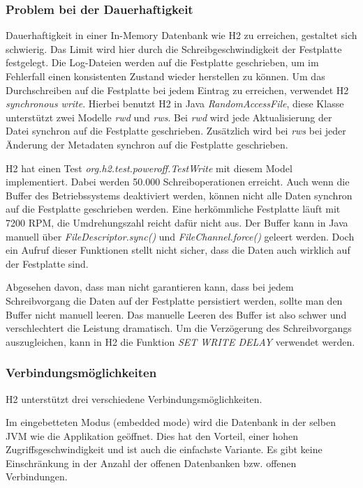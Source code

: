 \documentclass[draft,final]{vutinfth} %
\begin{document}
\subsubsection*{Problem bei der Dauerhaftigkeit}
Dauerhaftigkeit in einer In-Memory Datenbank wie H2 zu erreichen, gestaltet sich schwierig. Das Limit wird hier durch die Schreibgeschwindigkeit der Festplatte festgelegt. Die Log-Dateien werden auf die Festplatte geschrieben, um im Fehlerfall einen konsistenten Zustand wieder herstellen zu können. Um das Durchschreiben auf die Festplatte bei jedem Eintrag zu erreichen, verwendet H2 \textit{synchronous write}. Hierbei benutzt H2 in Java \textit{RandomAccessFile}, diese Klasse unterstützt zwei Modelle \textit{rwd} und \textit{rws}. Bei \textit{rwd} wird jede Aktualisierung der Datei synchron auf die Festplatte geschrieben. Zusätzlich wird bei \textit{rws} bei jeder Änderung der Metadaten synchron auf die Festplatte geschrieben.

H2 hat einen Test \textit{org.h2.test.poweroff.TestWrite} mit diesem Model implementiert. Dabei werden 50.000 Schreiboperationen erreicht. Auch wenn die Buffer des Betriebssystems deaktiviert werden, können nicht alle Daten synchron auf die Festplatte geschrieben werden. Eine herkömmliche Festplatte läuft mit 7200 RPM, die Umdrehungszahl reicht dafür nicht aus. Der Buffer kann in Java manuell über \textit{FileDescriptor.sync()} und \textit{FileChannel.force()} geleert werden. Doch ein Aufruf dieser Funktionen stellt nicht sicher, dass die Daten auch wirklich auf der Festplatte sind.

Abgesehen davon, dass man nicht garantieren kann, dass bei jedem Schreibvorgang die Daten auf der Festplatte persistiert werden, sollte man den Buffer nicht manuell leeren. Das manuelle Leeren des Buffer ist also schwer und verschlechtert die Leistung dramatisch. Um die Verzögerung des Schreibvorgangs auszugleichen, kann in H2 die Funktion \textit{SET WRITE DELAY} verwendet werden.


\subsubsection*{Verbindungsmöglichkeiten}
H2 unterstützt drei verschiedene Verbindungsmöglichkeiten. 

Im eingebetteten Modus (embedded mode) wird die Datenbank in der selben JVM wie die Applikation geöffnet. Dies hat den Vorteil, einer hohen Zugriffsgeschwindigkeit und ist auch die einfachste Variante. Es gibt keine Einschränkung in der Anzahl der offenen Datenbanken bzw. offenen Verbindungen.
\end{document}
